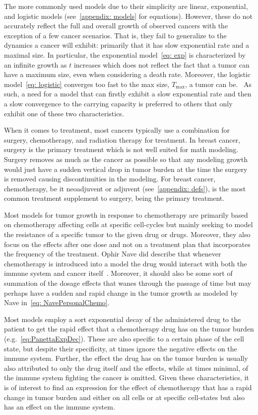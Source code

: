 \documentclass[11pt]{amsart}
\begin{document}
The more commonly used models due to their simplicity are linear, exponential, and logistic models (see\ \ref{appendix: models} for equations).
However, these do not accurately reflect the full and overall growth of observed cancers with the exception of a few cancer scenarios.
That is, they fail to generalize to the dynamics a cancer will exhibit: primarily that it has slow exponential rate and a maximal size.
In particular, the exponential model\ \eqref{eq: exp} is characterized by an infinite growth as $t$ increases which does not reflect the fact that a tumor can have a maximum size, even when considering a death rate.
Moreover, the logistic model\ \eqref{eq: logistic} converges too fast to the max size, $T_{\max}$, a tumor can be.\ \cite{Steb23}
As such, a need for a model that can firstly exhibit a slow exponential rate and then a slow convergence to the carrying capacity is preferred to others that only exhibit one of these two characteristics.

When it comes to treatment, most cancers typically use a combination for surgery, chemotherapy, and radiation therapy for treatment.
In breast cancer, surgery is the primary treatment which is not well suited for math modeling. 
Surgery removes as much as the cancer as possible so that any modeling growth would just have a sudden vertical drop in tumor burden at the time the surgery is removed causing discontinuities in the modeling.
For breast cancer, chemotherapy, be it neoadjuvent or adjuvent (see\ \ref{appendix: defs}), is the most common treatment supplement to surgery, being the primary treatment.

Most models for tumor growth in response to chemotherapy are primarily based on chemotherapy affecting cells at specific cell-cycles but mainly seeking to model the resistance of a specific tumor to the given drug or drugs.
Moreover, they also focus on the effects after one dose and not on a treatment plan that incorporates the frequency of the treatment.
Ophir Nave did describe that whenever chemotherapy is introduced into a model the drug would interact with both the immune system and cancer itself\ \cite{NAVE2022e09288}.
Moreover, it should also be some sort of summation of the dosage effects that wanes through the passage of time but may perhaps have a sudden and rapid change in the tumor growth as modeled by Nave in\ \eqref{eq: NavePersonalChemo}.

Most models employ a sort exponential decay of the administered drug to the patient to get the rapid effect that a chemotherapy drug has on the tumor burden (e.g.\ \eqref{eq:PanettaExpDec}).
These are also specific to a certain phase of the cell state, but despite their specificity, at times ignore the negative effects on the immune system.
Further, the effect the drug has on the tumor burden is usually also attributed to only the drug itself and the effects, while at times minimal, of the immune system fighting the cancer is omitted.
Given these characteristics, it is of interest to find an expression for the effect of chemotherapy that has a rapid change in tumor burden and either on all cells or at specific cell-states but also has an effect on the immune system.
\end{document}
